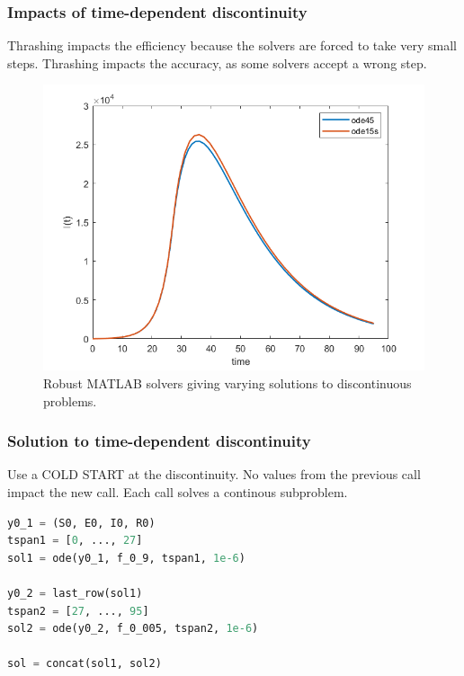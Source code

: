 \documentclass{beamer}
\begin{document}
\begin{frame}
\frametitle{Impacts of time-dependent discontinuity}
Thrashing impacts the efficiency because the solvers are forced to take very small steps.
Thrashing impacts the accuracy, as some solvers accept a wrong step.
\begin{figure}[H]
\centering
\includegraphics[width=0.7\linewidth]{./figures/time_discontinuity_matlab}
\caption{Robust MATLAB solvers giving varying solutions to discontinuous problems.}
\label{fig:time_discontinuity_matlab}
\end{figure}
\end{frame}

\begin{frame}[fragile]
\frametitle{Solution to time-dependent discontinuity}
Use a COLD START at the discontinuity. \newline 
No values from the previous call impact the new call. \newline
Each call solves a continous subproblem.
\begin{lstlisting}[language=Python]
y0_1 = (S0, E0, I0, R0)
tspan1 = [0, ..., 27]
sol1 = ode(y0_1, f_0_9, tspan1, 1e-6)

y0_2 = last_row(sol1)
tspan2 = [27, ..., 95]
sol2 = ode(y0_2, f_0_005, tspan2, 1e-6)

sol = concat(sol1, sol2)
\end{lstlisting}
\end{frame}
\end{document}
